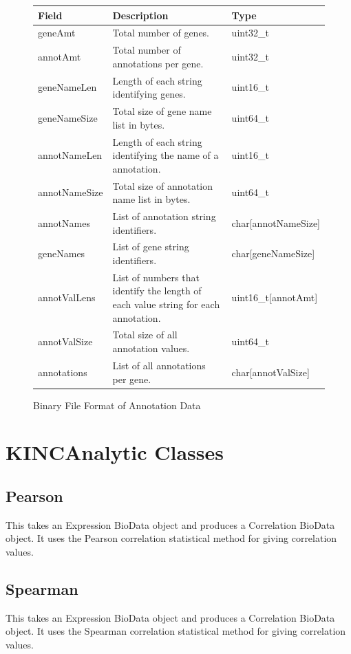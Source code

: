 \documentclass[10pt]{article}
\begin{document}
\begin{figure}[H]
\centering
\begin{tabularx}{\textwidth}{|l|X|l|}
\hline
\textbf{Field} & \textbf{Description} & \textbf{Type} \\
\hline
geneAmt & Total number of genes. & uint32\_t \\
\hline
annotAmt & Total number of annotations per gene. & uint32\_t \\
\hline
geneNameLen & Length of each string identifying genes. & uint16\_t \\
\hline
geneNameSize & Total size of gene name list in bytes. & uint64\_t \\
\hline
annotNameLen & Length of each string identifying the name of a annotation. & 
uint16\_t \\
\hline
annotNameSize & Total size of annotation name list in bytes. & uint64\_t \\
\hline
annotNames & List of annotation string identifiers. & char[annotNameSize] \\
\hline
geneNames & List of gene string identifiers. & char[geneNameSize] \\
\hline
annotValLens & List of numbers that identify the length of each value string 
for each annotation. & uint16\_t[annotAmt] \\
\hline
annotValSize & Total size of all annotation values. & uint64\_t \\
\hline
annotations & List of all annotations per gene. & char[annotValSize] \\
\hline
\end{tabularx}
\caption{Binary File Format of Annotation Data}
\label{fig:annotation}
\end{figure}

\newpage
\section{KINCAnalytic Classes}

\subsection{Pearson}

This takes an Expression BioData object and produces a Correlation BioData 
object. It uses the Pearson correlation statistical method for giving 
correlation values.

\subsection{Spearman}

This takes an Expression BioData object and produces a Correlation BioData 
object. It uses the Spearman correlation statistical method for giving 
correlation values.
\end{document}
